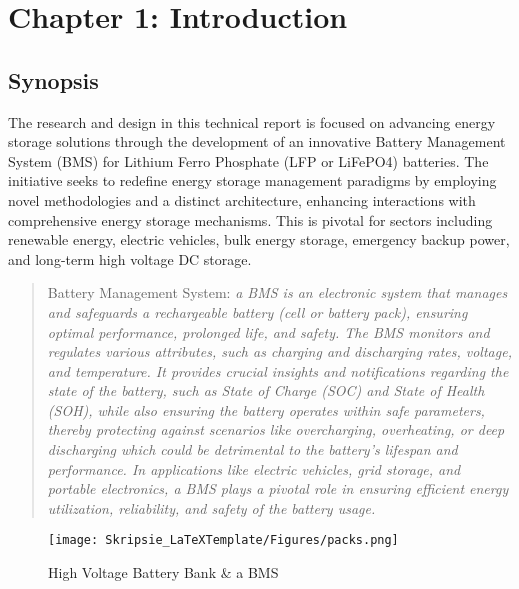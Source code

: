 \chapter[Introduction]{Chapter 1: Introduction}\label{chap:Proj_Ovv} %
\section{Synopsis}\label{sec:intro1} %
The research and design in this technical report is focused on advancing energy storage solutions through the development of an innovative Battery Management System (BMS) for Lithium Ferro Phosphate (LFP or LiFePO4) batteries. The initiative seeks to redefine energy storage management paradigms by employing novel methodologies and a distinct architecture, enhancing interactions with comprehensive energy storage mechanisms. This is pivotal for sectors including renewable energy, electric vehicles, bulk energy storage, emergency backup power, and long-term high voltage DC storage.
\begin{quote}
    {\small Battery Management System:\newline
    \emph{a BMS is an electronic system that manages and safeguards a rechargeable battery (cell or battery pack), ensuring optimal performance, prolonged life, and safety. The BMS monitors and regulates various attributes, such as charging and discharging rates, voltage, and temperature. It provides crucial insights and notifications regarding the state of the battery, such as State of Charge (SOC) and State of Health (SOH), while also ensuring the battery operates within safe parameters, thereby protecting against scenarios like overcharging, overheating, or deep discharging which could be detrimental to the battery’s lifespan and performance. In applications like electric vehicles, grid storage, and portable electronics, a BMS plays a pivotal role in ensuring efficient energy utilization, reliability, and safety of the battery usage.}\cite{Trad_BMS}
    }
\end{quote}
\begin{figure}[h!]
\centering
\texttt{[image: Skripsie\_LaTeXTemplate/Figures/packs.png]}
\caption{High Voltage Battery Bank \& a BMS \cite{tessla}}
\label{fig:pak}
\end{figure}

